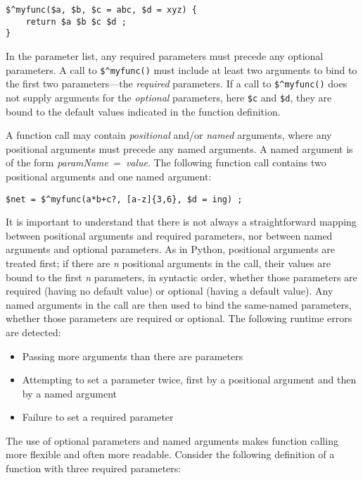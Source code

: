 \begin{Verbatim}
$^myfunc($a, $b, $c = abc, $d = xyz) {
	return $a $b $c $d ;
}
\end{Verbatim}

\noindent
In the parameter list, any required parameters must precede any optional parameters.
A call to \verb!$^myfunc()! must include at least two arguments to bind to
the first two parameters---the \emph{required} parameters.
If a call to \verb!$^myfunc()! does not supply arguments for the \emph{optional}
parameters, here \verb!$c! and \verb!$d!, they are bound to the default values indicated
in the function definition.

A function call may contain \emph{positional} and/or \emph{named}
arguments, where any positional arguments must precede any named arguments.  A
named argument is of the form \emph{paramName}~=~\emph{value}.
The following function call contains two positional arguments and one named
argument:

\begin{Verbatim}
$net = $^myfunc(a*b+c?, [a-z]{3,6}, $d = ing) ;
\end{Verbatim}

\noindent
It is important to understand that there is not always a straightforward mapping
between positional arguments and required parameters, nor between named
arguments and optional parameters.  As in Python, positional arguments
are treated first; if there are \emph{n} positional arguments in the
call, their
values are bound to the first \emph{n} parameters, in syntactic order,
whether those
parameters are required (having no default value) or optional (having a
default value).  Any named arguments in the call are then used
to bind the same-named parameters, whether those parameters are
required or optional.  The following runtime errors are detected:

\begin{itemize}
\item
Passing more arguments than there are parameters
\item
Attempting to set a parameter twice, first by a positional argument and
then by a named argument
\item
Failure to set a required parameter
\end{itemize}

The use of optional parameters and named arguments makes function calling more flexible and
often more readable.  Consider the following definition of a function
with three required parameters:

